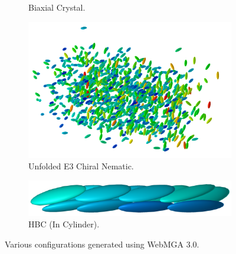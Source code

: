 \begin{figure}
\begin{center}
\begin{subfigure}{0.4\textwidth}
      \caption{Biaxial Crystal.}
    \end{subfigure}
    \begin{subfigure}{0.4\textwidth}
      \includegraphics[width=\textwidth]{assets/images/configs/chiral}
      \caption{Unfolded E3 Chiral Nematic.}
    \end{subfigure}
    \begin{subfigure}{0.4\textwidth}
      \includegraphics[width=\textwidth]{assets/images/configs/hbc}
      \caption{HBC (In Cylinder).}
    \end{subfigure}
  \end{center}
  \caption{Various configurations generated using WebMGA 3.0.}
  \label{fig:assorted_configs}
\end{figure}
